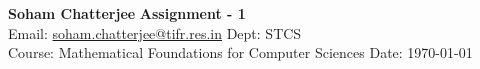 \documentclass[a4paper, 11pt]{article}
\begin{document}
	
	
	{\noindent \large\textbf{Soham Chatterjee} \hfill \textbf{Assignment - 1}\\
		Email: \href{soham.chatterjee@tifr.res.in}{soham.chatterjee@tifr.res.in} \hfill Dept: STCS\\
		\normalsize Course: Mathematical Foundations for Computer Sciences \hfill Date: \today}
	
	
\end{document}
